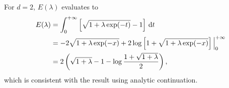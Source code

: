 \documentclass[11pt]{book}
\begin{document}


For $d=2$, $E(\lambda)$ evaluates to
\begin{equation}
  \begin{split}
  E(\lambda) &= \int^{+\infty}_0 \left[\sqrt{1+\lambda \exp(-t)} -1\right]\,{\rm d}t\\
  &= -2\sqrt{1+\lambda\exp(-x)} + 2\log\left[1+\sqrt{1+\lambda\exp(-x)}\right]\Big|^{+\infty}_0\\
  &= 2\left(\sqrt{1+\lambda} -1 -\log\frac{1+\sqrt{1+\lambda}}{2}\right),
  \end{split}
\end{equation}
which is consistent with the result using analytic continuation.

\bigbreak
\end{document}
